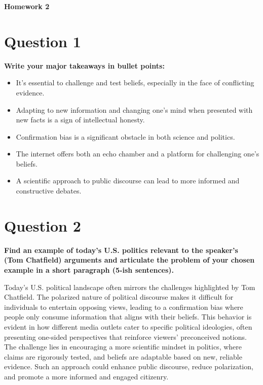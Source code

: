 \documentclass[12pt]{article}
\begin{document}
\begin{center}
\Large \textbf{Homework 2}
\end{center}

\section*{Question 1}
\textbf{Write your major takeaways in bullet points:}
\begin{itemize}
  \item It's essential to challenge and test beliefs, especially in the face of conflicting evidence.
  \item Adapting to new information and changing one's mind when presented with new facts is a sign of intellectual honesty.
  \item Confirmation bias is a significant obstacle in both science and politics.
  \item The internet offers both an echo chamber and a platform for challenging one's beliefs.
  \item A scientific approach to public discourse can lead to more informed and constructive debates.
\end{itemize}

\section*{Question 2}
\textbf{Find an example of today's U.S. politics relevant to the speaker's (Tom Chatfield) arguments and articulate the problem of your chosen example in a short paragraph (5-ish sentences).}

Today's U.S. political landscape often mirrors the challenges highlighted by Tom Chatfield. The polarized nature of political discourse makes it difficult for individuals to entertain opposing views, leading to a confirmation bias where people only consume information that aligns with their beliefs. This behavior is evident in how different media outlets cater to specific political ideologies, often presenting one-sided perspectives that reinforce viewers' preconceived notions. The challenge lies in encouraging a more scientific mindset in politics, where claims are rigorously tested, and beliefs are adaptable based on new, reliable evidence. Such an approach could enhance public discourse, reduce polarization, and promote a more informed and engaged citizenry.
\end{document}
